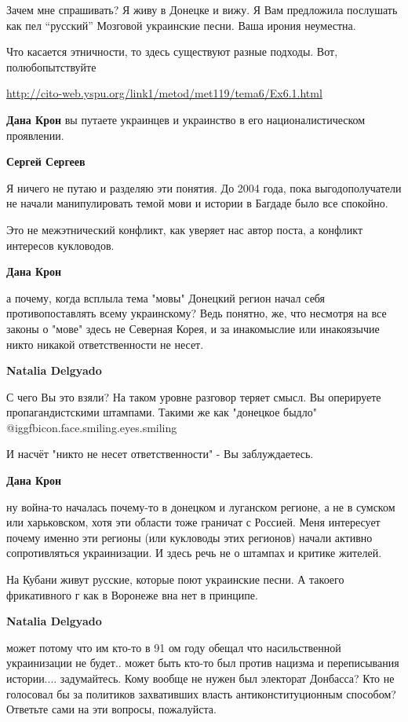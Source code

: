 \begin{itemize}
\begin{itemize}
Зачем мне спрашивать? Я живу в Донецке и вижу. Я Вам предложила послушать как
пел \enquote{русский} Мозговой украинские песни. Ваша ирония неуместна.

Что касается этничности, то здесь существуют разные подходы. Вот, полюбопытствуйте

\url{http://cito-web.yspu.org/link1/metod/met119/tema6/Ex6.1.html}

\textbf{Дана Крон} вы путаете украинцев и украинство в его националистическом проявлении.

\textbf{Сергей Сергеев} 

Я ничего не путаю и разделяю эти понятия. До 2004 года, пока выгодополучатели не
начали манипулировать темой мови и истории в Багдаде было все спокойно.

Это не межэтнический конфликт, как уверяет нас автор поста, а конфликт интересов кукловодов.

\textbf{Дана Крон} 

а почему, когда всплыла тема "мовы" Донецкий регион начал себя
противопоставлять всему украинскому? Ведь понятно, же, что несмотря на все
законы о "мове" здесь не Северная Корея, и за инакомыслие или инакоязычие никто
никакой ответственности не несет.

\textbf{Natalia Delgyado} 

С чего Вы это взяли? На таком уровне разговор теряет смысл. Вы оперируете
пропагандистскими штампами. Такими же как "донецкое быдло"  @igg{fbicon.face.smiling.eyes.smiling} 

И насчёт "никто не несет ответственности" - Вы заблуждаетесь.

\textbf{Дана Крон} 

ну война-то началась почему-то в донецком и луганском регионе, а не в сумском
или харьковском, хотя эти области тоже граничат с Россией. Меня интересует
почему именно эти регионы (или кукловоды этих регионов) начали активно
сопротивляться украинизации. И здесь речь не о штампах и критике жителей.


На Кубани живут русские, которые поют украинские песни. А такоего фрикативного г как в Воронеже вна нет в принципе.

\textbf{Natalia Delgyado} 

может потому что им кто-то в 91 ом году обещал что насильственной украинизации
не будет.. может быть кто-то был против нацизма и переписывания
истории.... задумайтесь. Кому вообще не нужен был электорат Донбасса? Кто не
голосовал бы за политиков захвативших власть антиконституционным
способом? Ответьте сами на эти вопросы, пожалуйста.


\end{itemize}
\end{itemize}
